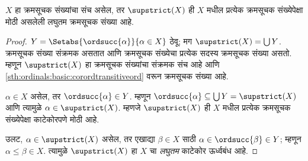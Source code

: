 \begin{prop}
$X$ हा क्रमसूचक संख्यांचा संच असेल, तर $\supstrict(X)$ ही $X$ मधील प्रत्येक क्रमसूचक संख्येपेक्षा मोठी असलेली लघुतम क्रमसूचक संख्या आहे.
\end{prop}

\begin{proof}
$Y = \Setabs{\ordsucc{\alpha}}{\alpha \in X}$ ठेवू; मग $\supstrict(X) = \bigcup Y$. क्रमसूचक संख्या संक्रमक असतात आणि क्रमसूचक संख्येचा प्रत्येक सदस्य क्रमसूचक संख्या असतो. म्हणून $\supstrict(X)$ हा क्रमसूचक संख्यांचा संक्रमक संच आहे आणि \ref{sth:ordinals:basic:corordtransitiveord} वरून क्रमसूचक संख्या आहे.

$\alpha \in X$ असेल, तर $\ordsucc{\alpha} \in Y$. म्हणून $\ordsucc{\alpha}
\subseteq \bigcup Y = \supstrict(X)$ आणि त्यामुळे $\alpha \in
\supstrict(X)$. म्हणजे $\supstrict(X)$ ही $X$ मधील प्रत्येक क्रमसूचक संख्येपेक्षा काटेकोरपणे मोठी आहे.

उलट, $\alpha \in \supstrict(X)$ असेल, तर एखाद्या $\beta \in X$ साठी $\alpha \in
\ordsucc{\beta} \in Y$; म्हणून $\alpha \leq
\beta \in X$. त्यामुळे $\supstrict(X)$ हा $X$ चा \emph{लघुतम} काटेकोर ऊर्ध्वबंध आहे.
\end{proof}



